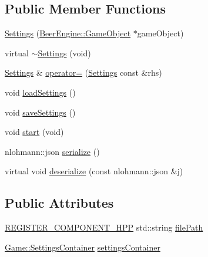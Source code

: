 \subsection*{Public Member Functions}
\begin{DoxyCompactItemize}
\item 
\mbox{\hyperlink{class_game_1_1_component_1_1_settings_a2a0d16fdd698140da965cd3367601a49}{Settings}} (\mbox{\hyperlink{class_beer_engine_1_1_game_object}{Beer\+Engine\+::\+Game\+Object}} $\ast$game\+Object)
\item 
virtual \mbox{\hyperlink{class_game_1_1_component_1_1_settings_ad6ce9d5380a251f7a46c4360419211eb}{$\sim$\+Settings}} (void)
\item 
\mbox{\hyperlink{class_game_1_1_component_1_1_settings}{Settings}} \& \mbox{\hyperlink{class_game_1_1_component_1_1_settings_a8744e8a07e0c730945508836912a7609}{operator=}} (\mbox{\hyperlink{class_game_1_1_component_1_1_settings}{Settings}} const \&rhs)
\item 
void \mbox{\hyperlink{class_game_1_1_component_1_1_settings_a8edddda1b5367a5343f2182750f0f36b}{load\+Settings}} ()
\item 
void \mbox{\hyperlink{class_game_1_1_component_1_1_settings_ad8883dfb4a2ae8a041e293e73c7a6dc5}{save\+Settings}} ()
\item 
void \mbox{\hyperlink{class_game_1_1_component_1_1_settings_adc79077ed00bee2d8ed987ea4b86a331}{start}} (void)
\item 
nlohmann\+::json \mbox{\hyperlink{class_game_1_1_component_1_1_settings_a1e378dbe2c0c7a198eae234e5979e91f}{serialize}} ()
\item 
virtual void \mbox{\hyperlink{class_game_1_1_component_1_1_settings_ae9edc71830f43d318f8dbcedce2d8bf9}{deserialize}} (const nlohmann\+::json \&j)
\end{DoxyCompactItemize}
\subsection*{Public Attributes}
\begin{DoxyCompactItemize}
\item 
\mbox{\hyperlink{_core_8hpp_a895cfc16b36b6c309f80b98ded63df4f}{R\+E\+G\+I\+S\+T\+E\+R\+\_\+\+C\+O\+M\+P\+O\+N\+E\+N\+T\+\_\+\+H\+PP}} std\+::string \mbox{\hyperlink{class_game_1_1_component_1_1_settings_ac8443df701a872a580cfad5e6a6d9fcc}{file\+Path}}
\item 
\mbox{\hyperlink{class_game_1_1_settings_container}{Game\+::\+Settings\+Container}} \mbox{\hyperlink{class_game_1_1_component_1_1_settings_a89bf0344b96da55d2cac38cda9b2faaa}{settings\+Container}}
\end{DoxyCompactItemize}
